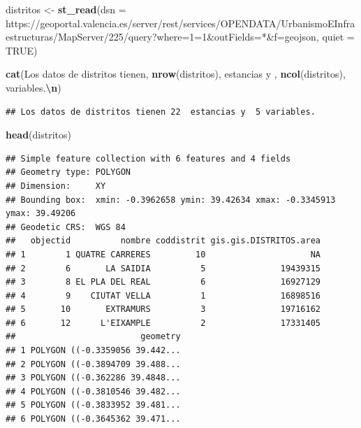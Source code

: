 \documentclass[notspecified,article,submit,moreauthors,pdftex]{Definitions/mdpi}
\newenvironment{Shaded}{\begin{snugshade}}{\end{snugshade}}
\newcommand{\AttributeTok}[1]{\textcolor[rgb]{0.13,0.29,0.53}{#1}}
\newcommand{\ConstantTok}[1]{\textcolor[rgb]{0.56,0.35,0.01}{#1}}
\newcommand{\FunctionTok}[1]{\textcolor[rgb]{0.13,0.29,0.53}{\textbf{#1}}}
\newcommand{\NormalTok}[1]{#1}
\newcommand{\OtherTok}[1]{\textcolor[rgb]{0.56,0.35,0.01}{#1}}
\newcommand{\SpecialCharTok}[1]{\textcolor[rgb]{0.81,0.36,0.00}{\textbf{#1}}}
\newcommand{\StringTok}[1]{\textcolor[rgb]{0.31,0.60,0.02}{#1}}
\begin{document}
\begin{Shaded}
\begin{Highlighting}[]
\NormalTok{distritos }\OtherTok{\textless{}{-}} \FunctionTok{st\_read}\NormalTok{(}\AttributeTok{dsn =} \StringTok{\textquotesingle{}https://geoportal.valencia.es/server/rest/services/OPENDATA/UrbanismoEInfraestructuras/MapServer/225/query?where=1=1\&outFields=*\&f=geojson\textquotesingle{}}\NormalTok{, }\AttributeTok{quiet =} \ConstantTok{TRUE}\NormalTok{)}

\FunctionTok{cat}\NormalTok{(}\StringTok{\textquotesingle{}Los datos de distritos tienen\textquotesingle{}}\NormalTok{, }\FunctionTok{nrow}\NormalTok{(distritos), }\StringTok{\textquotesingle{} estancias y \textquotesingle{}}\NormalTok{, }\FunctionTok{ncol}\NormalTok{(distritos), }\StringTok{\textquotesingle{}variables.}\SpecialCharTok{\textbackslash{}n}\StringTok{\textquotesingle{}}\NormalTok{)}
\end{Highlighting}
\end{Shaded}

\begin{verbatim}
## Los datos de distritos tienen 22  estancias y  5 variables.
\end{verbatim}

\begin{Shaded}
\begin{Highlighting}[]
\FunctionTok{head}\NormalTok{(distritos)}
\end{Highlighting}
\end{Shaded}

\begin{verbatim}
## Simple feature collection with 6 features and 4 fields
## Geometry type: POLYGON
## Dimension:     XY
## Bounding box:  xmin: -0.3962658 ymin: 39.42634 xmax: -0.3345913 ymax: 39.49206
## Geodetic CRS:  WGS 84
##   objectid          nombre coddistrit gis.gis.DISTRITOS.area
## 1        1 QUATRE CARRERES         10                     NA
## 2        6       LA SAIDIA          5               19439315
## 3        8 EL PLA DEL REAL          6               16927129
## 4        9    CIUTAT VELLA          1               16898516
## 5       10       EXTRAMURS          3               19716162
## 6       12      L'EIXAMPLE          2               17331405
##                         geometry
## 1 POLYGON ((-0.3359056 39.442...
## 2 POLYGON ((-0.3894709 39.488...
## 3 POLYGON ((-0.362286 39.4848...
## 4 POLYGON ((-0.3810546 39.482...
## 5 POLYGON ((-0.3833952 39.481...
## 6 POLYGON ((-0.3645362 39.471...
\end{verbatim}
\end{document}
